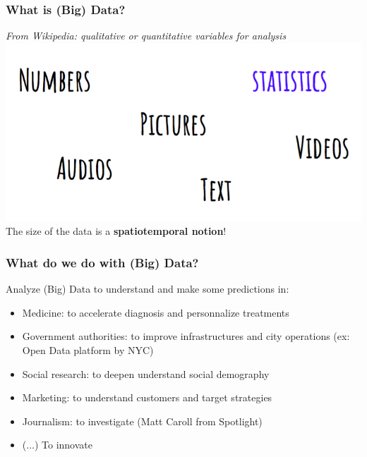 \begin{frame}
\frametitle{What is (Big) Data?}
\vskip 1.0cm
\textit{From Wikipedia: \textcolor{isvblue}{qualitative or quantitative} variables for analysis}
    \includegraphics[width=1.0\textwidth]{./pictures/data-what.png}\\
\textcolor{isvblue}{The size of the data is a \textbf{spatiotemporal notion}!} 
\end{frame}

\begin{frame}
\frametitle{What do we do with (Big) Data?}
\vskip 0.8cm
Analyze (Big) Data to \textcolor{isvblue}{understand} and make some \textcolor{isvblue}{predictions} in:
\begin{itemize}
  \item \textcolor{isvblue}{Medicine}: to accelerate diagnosis and personnalize treatments  
  \item \textcolor{isvblue}{Government authorities}: to improve infrastructures and city operations (ex: Open Data platform by NYC)
  \item \textcolor{isvblue}{Social research}: to deepen understand social demography
  \item \textcolor{isvblue}{Marketing}: to understand customers and target strategies
  \item \textcolor{isvblue}{Journalism}: to investigate (Matt Caroll from Spotlight)
  \item (...) \textcolor{isvblue}{To innovate}
\end{itemize}
\end{frame}

